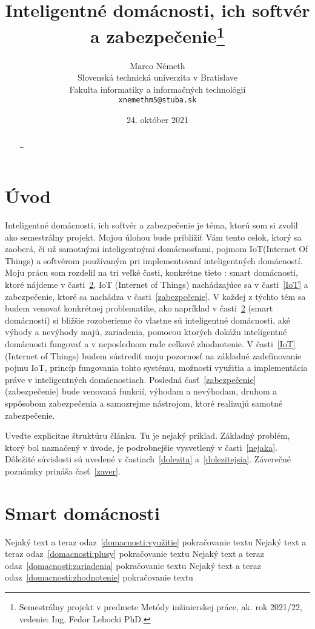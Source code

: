 \documentclass[10pt,twoside,slovak,a4paper]{article}
\title{Inteligentné domácnosti, ich softvér a zabezpečenie\thanks{Semestrálny projekt v predmete Metódy inžinierskej práce, ak. rok 2021/22, vedenie: Ing. Fedor Lehocki PhD.}} %
\author{Marco Németh\\[2pt]
	{\small Slovenská technická univerzita v Bratislave}\\
	{\small Fakulta informatiky a informačných technológií}\\
	{\small \texttt{xnemethm5@stuba.sk}}
	}
\date{\small 24. október 2021} %
\begin{document}
\maketitle

\begin{abstract}
\ldots
\end{abstract}



\section{Úvod}

Inteligentné domácnosti, ich softvér a zabezpečenie je téma, ktorú som si zvolil ako semestrálny projekt. Mojou úlohou bude priblížiť Vám tento celok, ktorý sa zaoberá, či už samotnými inteligentnými domácnosťami, pojmom IoT(Internet Of Things) a softvérom používaným pri implementovaní inteligentných domácností. 
Moju prácu som rozdelil na tri veľké časti, konkrétne tieto : smart domácnosti, ktoré nájdeme v časti~\ref{domácnosti}, IoT (Internet of Things) nachádzajúce sa v časti~\ref{IoT}  a zabezpečenie, ktoré sa nachádza v časti~\ref{zabezpečenie}. V každej z týchto tém sa budem venovať konkrétnej problematike, ako napríklad v časti~\ref{domácnosti} (smart domácnosti) si bližšie rozoberieme čo vlastne sú inteligentné domácnosti, aké výhody a nevýhody majú, zariadenia, pomocou ktorých dokážu inteligentné domácnosti fungovať a v neposlednom rade celkové zhodnotenie. V časti~\ref{IoT} (Internet of Things) budem sústrediť moju pozornosť na základné zadefinovanie pojmu IoT, princíp fungovania tohto systému, možnosti využitia a implementácia práve v inteligentných domácnostiach. 
Posledná časť~\ref{zabezpečenie} (zabezpečenie) bude venovaná funkcií, výhodam a nevýhodam, druhom a sppôsobom zabezpečenia a samozrejme nástrojom, ktoré realizujú samotné zabezpečenie.

Uveďte explicitne štruktúru článku. Tu je nejaký príklad.
Základný problém, ktorý bol naznačený v úvode, je podrobnejšie vysvetlený v časti~\ref{nejaka}.
Dôležité súvislosti sú uvedené v častiach~\ref{dolezita} a~\ref{dolezitejsia}.
Záverečné poznámky prináša časť~\ref{zaver}.

\section{Smart domácnosti}\label{domácnosti}
Nejaký text a teraz odaz~\ref{domacnosti:využitie} pokračovanie textu
Nejaký text a teraz odaz~\ref{domacnosti:plusy} pokračovanie textu
Nejaký text a teraz odaz~\ref{domacnosti:zariadenia} pokračovanie textu
Nejaký text a teraz odaz~\ref{domacnosti:zhodnotenie} pokračovanie textu
\end{document}
